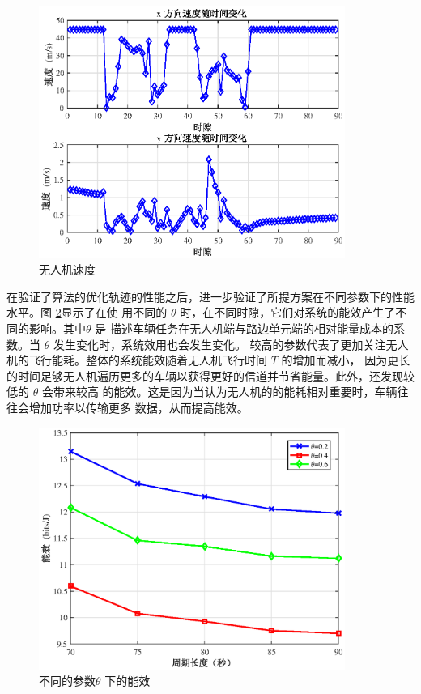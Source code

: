 \begin{figure}[H]
\centering
\includegraphics[width=10cm]{figures//chap4//无人机速度.eps}
\caption{无人机速度}
\label{无人机速度}
\end{figure}
在验证了算法的优化轨迹的性能之后，进一步验证了所提方案在不同参数下的性能水平。图 \ref{不同的参数theta下的能效}显示了在使
用不同的 $\theta$ 时，在不同时隙，它们对系统的能效产生了不同的影响。其中$\theta$ 是
描述车辆任务在无人机端与路边单元端的相对能量成本的系数。当 $\theta$ 发生变化时，系统效用也会发生变化。
较高的参数代表了更加关注无人机的飞行能耗。整体的系统能效随着无人机飞行时间 $T$ 的增加而减小，
因为更长的时间足够无人机遍历更多的车辆以获得更好的信道并节省能量。此外，还发现较低的 $\theta$ 会带来较高
的能效。这是因为当认为无人机的的能耗相对重要时，车辆往往会增加功率以传输更多
数据，从而提高能效。
\begin{figure}[H]
\centering
\includegraphics[width=10cm]{figures//chap4//不同的参数theta下的能效.eps}
\caption{不同的参数$\theta$ 下的能效}
\label{不同的参数theta下的能效}
\end{figure}



